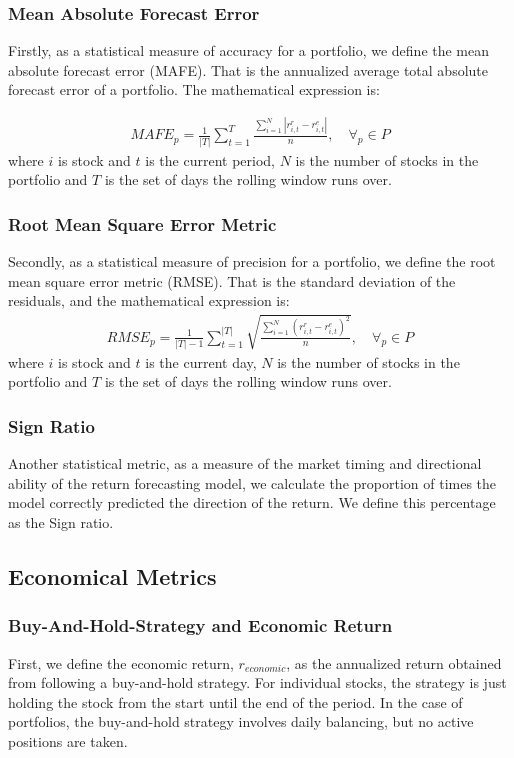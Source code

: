 \subsubsection{Mean Absolute Forecast Error}
Firstly, as a statistical measure of accuracy for a portfolio, we define the mean absolute forecast error (MAFE). That is the annualized average total absolute forecast error of a portfolio. The mathematical expression is:

\begin{align}
    MAFE_{p} =  \frac{1}{|T|}\sum_{t=1}^{T}\frac{\sum_{i=1}^{N}|r_{i,t}^{r} - r_{i,t}^{e}|}{n}, \quad \forall_p \in P
\end{align}
where $i$ is stock and $t$ is the current period, $N$ is the number of stocks in the portfolio and $T$ is the set of days the rolling window runs over.

\subsubsection{Root Mean Square Error Metric}
Secondly, as a statistical measure of precision for a portfolio, we define the root mean square error metric (RMSE). That is the standard deviation of the residuals, and the mathematical expression is:
\begin{align}
    RMSE_{p} = \frac{1}{|T|-1}\sum_{t=1}^{|T|}\sqrt{\frac{\sum_{i=1}^{N}(r_{i,t}^{r} - r_{i,t}^{e})^{2}}{n}}, \quad \forall_p \in P
\end{align}
where $i$ is stock and $t$ is the current day, $N$ is the number of stocks in the portfolio and $T$ is the set of days the rolling window runs over.

\subsubsection{Sign Ratio}
Another statistical metric, as a measure of the market timing and directional ability of the return forecasting model, we calculate the proportion of times the model correctly predicted the direction of the return. We define this percentage as the Sign ratio.

\subsection{Economical Metrics}

\subsubsection{Buy-And-Hold-Strategy and Economic Return}
First, we define the economic return, $r_{economic}$, as the annualized return obtained from following a buy-and-hold strategy. For individual stocks, the strategy is just holding the stock from the start until the end of the period. In the case of portfolios, the buy-and-hold strategy involves daily balancing, but no active positions are taken.

